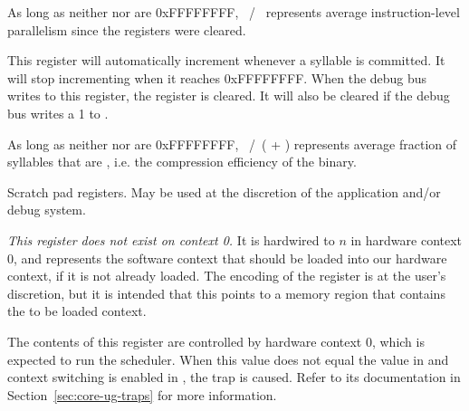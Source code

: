 As long as neither  nor  are 0xFFFFFFFF,
~/~ represents average instruction-level parallelism since
the registers were cleared.

\debugCanWrite{}


This register will automatically increment whenever a  syllable is
committed. It will stop incrementing when it reaches 0xFFFFFFFF. When the debug
bus writes to this register, the register is cleared. It will also be cleared
if the debug bus writes a 1 to .

As long as neither  nor  are 0xFFFFFFFF,
~/~( + ) represents average fraction of syllables
that are , i.e. the compression efficiency of the binary.

\debugCanWrite{}


Scratch pad registers. May be used at the discretion of the application and/or
debug system.

\debugCanWrite{}
\coreCanWrite{}


\emph{This register does not exist on context 0.} It is hardwired to
$n$ in hardware context 0, and represents the software context that
should be loaded into our hardware context, if it is not already loaded. The
encoding of the register is at the user's discretion, but it is intended that
this points to a memory region that contains the to be loaded context.

The contents of this register are controlled by hardware context 0, which is 
expected to run the scheduler. When this value does not equal the value in 
 and context switching is enabled in , the 
 trap is caused. Refer to its documentation in
Section~\ref{sec:core-ug-traps} for more information.


